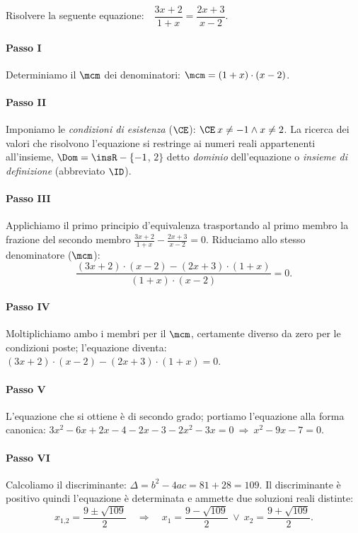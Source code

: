 \begin{exrig}
\begin{esempio}
Risolvere la seguente equazione:~~$\dfrac{3 x + 2}{1 + x}=\dfrac{2 x + 3}{x - 2}$.
 \paragraph{Passo I} Determiniamo il $\mcm$ dei denominatori: $\mcm = ( 1 + x ) \cdot ( x - 2 )$.
 \paragraph{Passo II} Imponiamo le \emph{condizioni di esistenza} ($\CE$): $\CE\: x \neq - 1 \wedge x \neq 2$. La ricerca dei valori che risolvono l'equazione si restringe ai numeri reali appartenenti all'insieme, $\Dom = \insR - \{-1$, $2\}$ detto \emph{dominio} dell'equazione o \emph{insieme di definizione} (abbreviato $\ID$).
 \paragraph{Passo III} Applichiamo il primo principio d'equivalenza trasportando al primo membro la frazione del secondo membro $\frac{3 x + 2}{1 + x} - \frac{2 x + 3}{x - 2} = 0$. Riduciamo allo stesso denominatore ($\mcm$): 
\[\frac{( 3 x + 2 ) \cdot ( x - 2 ) - ( 2 x + 3 ) \cdot ( 1 + x )}{( 1 +x ) \cdot ( x - 2 )}=0.\]
 \paragraph{Passo IV} Moltiplichiamo ambo i membri per il $\mcm$, certamente diverso da zero per le condizioni poste; l'equazione diventa: $( 3 x + 2 ) \cdot ( x - 2 ) - ( 2 x + 3 ) \cdot ( 1 + x )=0$.
 \paragraph{Passo V} L'equazione che si ottiene è di secondo grado; portiamo l'equazione alla forma canonica: $3 x^{2} - 6 x + 2 x - 4 - 2 x - 3 - 2 x^{2} - 3 x=0 \:\Rightarrow\: x^{2} - 9 x - 7=0$.
 \paragraph{Passo VI} Calcoliamo il discriminante: $\Delta=b^{2} - 4 a c=81 + 28 = 109$. Il discriminante è positivo quindi l'equazione è determinata e ammette due soluzioni reali distinte: 
\[x_{1\text{,}2}=\frac{9 \pm \sqrt{109}}{2} \quad\Rightarrow\quad x_{1}=\frac{9 - \sqrt{109}}{2} \:\vee\: x_{2}=\frac{9 + \sqrt{109}}{2}.\]

\end{esempio}
\end{exrig}
